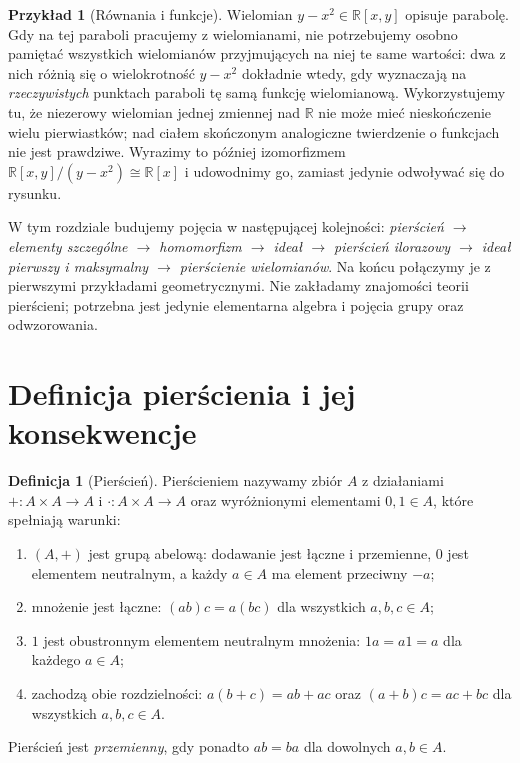 \documentclass[11pt,a4paper,openany]{report}
\numberwithin{equation}{section}
\theoremstyle{plain}
\theoremstyle{definition}
\newtheorem{definicja}[twierdzenie]{Definicja}
\newtheorem{przyklad}[twierdzenie]{Przykład}
\theoremstyle{remark}
\newcommand{\R}{\mathbb R}
\begin{document}
\begin{przyklad}[Równania i funkcje]
Wielomian $y-x^2\in\R[x,y]$ opisuje parabolę. Gdy na tej paraboli
pracujemy z wielomianami, nie potrzebujemy osobno pamiętać wszystkich
wielomianów przyjmujących na niej te same wartości: dwa z nich różnią się
o wielokrotność $y-x^2$ dokładnie wtedy, gdy wyznaczają na \emph{rzeczywistych}
punktach paraboli tę samą funkcję wielomianową. Wykorzystujemy tu, że
niezerowy wielomian jednej zmiennej nad $\R$ nie może mieć nieskończenie
wielu pierwiastków; nad ciałem skończonym analogiczne twierdzenie o funkcjach
nie jest prawdziwe. Wyrazimy to później izomorfizmem
$\R[x,y]/(y-x^2)\cong\R[x]$ i udowodnimy go, zamiast jedynie odwoływać się
do rysunku.
\end{przyklad}

W tym rozdziale budujemy pojęcia w następującej kolejności:
\emph{pierścień $\to$ elementy szczególne $\to$ homomorfizm $\to$
ideał $\to$ pierścień ilorazowy $\to$ ideał pierwszy i maksymalny $\to$
pierścienie wielomianów}. Na końcu połączymy je z pierwszymi przykładami
geometrycznymi. Nie zakładamy znajomości teorii pierścieni; potrzebna jest
jedynie elementarna algebra i pojęcia grupy oraz odwzorowania.

\section{Definicja pierścienia i jej konsekwencje}

\begin{definicja}[Pierścień]
\label{def:pierscien}
Pierścieniem nazywamy zbiór $A$ z działaniami
$+\colon A\times A\to A$ i $\cdot\colon A\times A\to A$ oraz wyróżnionymi
elementami $0,1\in A$, które spełniają warunki:
\begin{enumerate}[label=(P\arabic*)]
\item $(A,+)$ jest grupą abelową: dodawanie jest łączne i przemienne,
$0$ jest elementem neutralnym, a każdy $a\in A$ ma element przeciwny $-a$;
\item mnożenie jest łączne: $(ab)c=a(bc)$ dla wszystkich $a,b,c\in A$;
\item $1$ jest obustronnym elementem neutralnym mnożenia:
$1a=a1=a$ dla każdego $a\in A$;
\item zachodzą obie rozdzielności:
$a(b+c)=ab+ac$ oraz $(a+b)c=ac+bc$ dla wszystkich $a,b,c\in A$.
\end{enumerate}
Pierścień jest \emph{przemienny}, gdy ponadto $ab=ba$ dla dowolnych $a,b\in A$.
\end{definicja}
\end{document}
